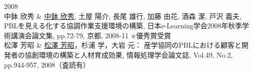 \documentclass[11pt,a4paper,twoside]{jarticle}
\newcommand{\研究種別}{B}	%
\newcommand{\研究課題名}{コ・クリエイティブなソフトウェア開発者を育成するPBL型教育}
\newcommand{\研究機関名}{産業技術大学院大学}
\newcommand{\研究代表者氏名}{中鉢　欣秀}
\newcommand{\研究代表者氏名ふりがな}{ちゅうばち　よしひで}
\newcommand{\me}{\underline{\underline{中鉢 欣秀}}}
\newcommand{\本応募effort}{\KLEffort{18}}	%
\newcommand{\研究期間の最終元号年度}{27}	%
\begin{document}
{	2008 \\
		中鉢 欣秀
		&  \KLbibitem \me, 土屋 陽介, 長尾 雄行, 加藤 由花, 酒森 潔, 戸沢 義夫, PBLを見える化する協調作業支援環境の構築, 日本e-Learning学会2008年秋季学術講演会論文集, pp.72-79, 京都, 2008-11 ※優秀賞受賞 \\
		松澤 芳昭
		& \KLbibitem \label{pub:matsuzawa-2008} \underline{松澤 芳昭}，杉浦 学，大岩 元： 産学協同のPBLにおける顧客と開発者の協創環境の構築と人材育成効果, 情報処理学会論文誌,  Vol.49, No.2, pp.944-957, 2008（査読有） \\
}

\newcommand{\連携研究者の研究業績}{%
}
\end{document}
